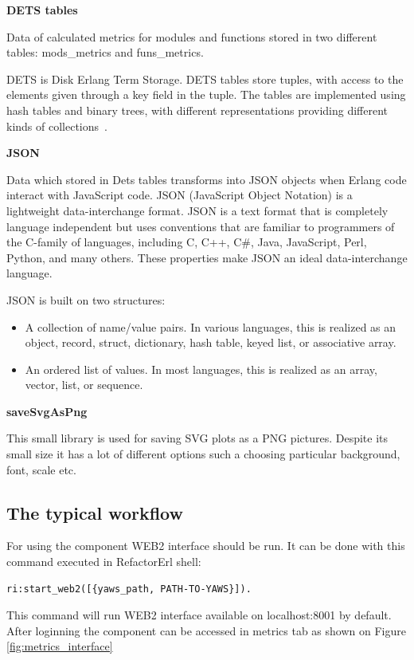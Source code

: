 \textbf{DETS tables}

Data of calculated metrics for modules and functions stored in two different tables: mods\_metrics and funs\_metrics.

DETS is Disk Erlang Term Storage. DETS tables store tuples, with access to the elements given through a  key field in the tuple. The tables are implemented using hash tables and binary trees, with different representations providing different kinds of collections~\cite{erland_o'reilly}.

\textbf{JSON}

Data which stored in Dets tables transforms into JSON objects when Erlang code interact with JavaScript code.
JSON (JavaScript Object Notation) is a lightweight data-interchange format.
JSON is a text format that is completely language independent but uses conventions that are familiar to programmers of the C-family of languages, including C, C++, C\#, Java, JavaScript, Perl, Python, and many others. These properties make JSON an ideal data-interchange language.

JSON is built on two structures:
\begin{itemize}
	\item A collection of name/value pairs. In various languages, this is realized as an object, record, struct, dictionary, hash table, keyed list, or associative array.
	\item An ordered list of values. In most languages, this is realized as an array, vector, list, or sequence.
\end{itemize}

\textbf{saveSvgAsPng}

This small library is used for saving SVG plots as a PNG pictures. Despite its small size it has a lot of different options such a choosing particular background, font, scale etc. 

\subsection{The typical workflow}

For using the component WEB2 interface should be run. It can be done with this command executed in RefactorErl shell:

\begin{lstlisting}[frame=none, numbers=none]
	ri:start_web2([{yaws_path, PATH-TO-YAWS}]).
\end{lstlisting}

This command will run WEB2 interface available on localhost:8001 by default. After loginning the component can be accessed in metrics tab as shown on Figure \ref{fig:metrics_interface}

